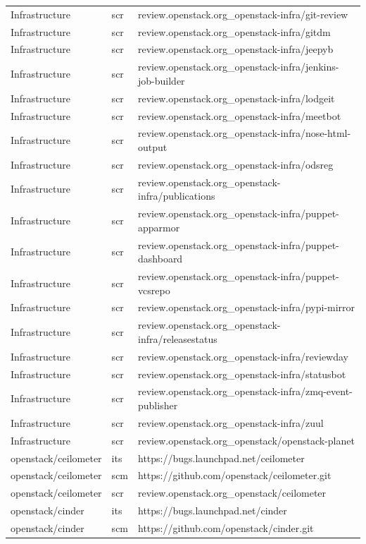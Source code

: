 \documentclass[a4wide,11pt]{report}
\begin{document}
\begin{center}
\begin{longtable}{|p{4cm}|p{1cm}|p{10cm}|}
Infrastructure&scr&review.openstack.org\_openstack-infra/git-review\\ 
Infrastructure&scr&review.openstack.org\_openstack-infra/gitdm\\ 
Infrastructure&scr&review.openstack.org\_openstack-infra/jeepyb\\ 
Infrastructure&scr&review.openstack.org\_openstack-infra/jenkins-job-builder\\ 
Infrastructure&scr&review.openstack.org\_openstack-infra/lodgeit\\ 
Infrastructure&scr&review.openstack.org\_openstack-infra/meetbot\\ 
Infrastructure&scr&review.openstack.org\_openstack-infra/nose-html-output\\ 
Infrastructure&scr&review.openstack.org\_openstack-infra/odsreg\\ 
Infrastructure&scr&review.openstack.org\_openstack-infra/publications\\ 
Infrastructure&scr&review.openstack.org\_openstack-infra/puppet-apparmor\\ 
Infrastructure&scr&review.openstack.org\_openstack-infra/puppet-dashboard\\ 
Infrastructure&scr&review.openstack.org\_openstack-infra/puppet-vcsrepo\\ 
Infrastructure&scr&review.openstack.org\_openstack-infra/pypi-mirror\\ 
Infrastructure&scr&review.openstack.org\_openstack-infra/releasestatus\\ 
Infrastructure&scr&review.openstack.org\_openstack-infra/reviewday\\ 
Infrastructure&scr&review.openstack.org\_openstack-infra/statusbot\\ 
Infrastructure&scr&review.openstack.org\_openstack-infra/zmq-event-publisher\\ 
Infrastructure&scr&review.openstack.org\_openstack-infra/zuul\\ 
Infrastructure&scr&review.openstack.org\_openstack/openstack-planet\\ 
openstack/ceilometer&its&https://bugs.launchpad.net/ceilometer\\ 
openstack/ceilometer&scm&https://github.com/openstack/ceilometer.git\\ 
openstack/ceilometer&scr&review.openstack.org\_openstack/ceilometer\\ 
openstack/cinder&its&https://bugs.launchpad.net/cinder\\ 
openstack/cinder&scm&https://github.com/openstack/cinder.git\\ 

\end{longtable}
\end{center}
\end{document}
